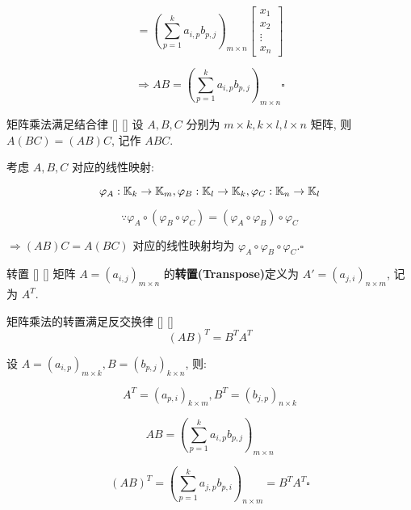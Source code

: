 \documentclass[UTF8]{ctexart}
\DeclareMathOperator{\0}{\mathbf{0}}
\DeclareMathOperator{\<}{\langle}
\renewcommand{\>}{\rangle}
\begin{document}
\begin{prf}
			\[
			=(\sum_{p=1}^{k}a_{i,p}b_{p,j})_{m\times n}\begin{bmatrix}x_1\\x_2\\\vdots\\x_n\end{bmatrix}
			\]
			
			\[\Longrightarrow AB=(\sum_{p=1}^{k}a_{i,p}b_{p,j})_{m\times n}\square\]
		\end{prf}
  
		\begin{ppt}
			[]
			{矩阵乘法满足结合律}
			[]
			[]
			设 \(A,B,C\) 分别为 \(m\times k, k\times l, l\times n\) 矩阵, 则 \(A(BC)=(AB)C\), 记作 \(ABC\). 
		\end{ppt}
  
		\begin{prf}
			考虑 \(A,B,C\) 对应的线性映射: 
			
			\[\varphi_A:\operatorname{\mathbb{K}}_k\to\operatorname{\mathbb{K}}_m,\varphi_B:\operatorname{\mathbb{K}}_l\to\operatorname{\mathbb{K}}_k,\varphi_C:\operatorname{\mathbb{K}}_n\to\operatorname{\mathbb{K}}_l\]
			
			\[\because\varphi_A\circ(\varphi_B\circ\varphi_C)=(\varphi_A\circ\varphi_B)\circ\varphi_C\]
			
			 \(\Longrightarrow (AB)C=A(BC)\) 对应的线性映射均为 \(\varphi_A\circ\varphi_B\circ\varphi_C.\square\) 
		\end{prf}
  
		\begin{dfn}
			[]
			{转置}
			[]
			[]
			矩阵 \(A=(a_{i,j})_{m\times n}\) 的\textbf{转置(Transpose)}定义为 \(A'=(a_{j,i})_{n\times m}\), 记为 \(A^T\). 
		\end{dfn}
		
		\begin{ppt}
			[]
			{矩阵乘法的转置满足反交换律}
			[]
			[]
			\[(AB)^T=B^TA^T\]
		\end{ppt}
  
		\begin{prf}
		
			设 \(A=(a_{i,p})_{m\times k}, B=(b_{p,j})_{k\times n}\), 则: 
			
			\[A^T=(a_{p,i})_{k\times m}, B^T=(b_{j,p})_{n\times k}\]
			
			\[AB=(\sum_{p=1}^{k}a_{i,p}b_{p,j})_{m\times n}\]
			
			\[(AB)^T=(\sum_{p=1}^{k}a_{j,p}b_{p,i})_{n\times m}=B^TA^T\square\]
		\end{prf}
\end{document}

